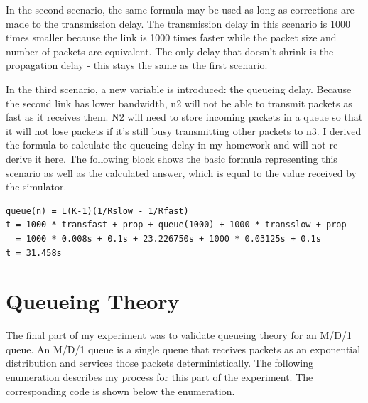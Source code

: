 \documentclass[11pt]{article}
\begin{document}
In the second scenario, the same formula may be used as long as corrections are made to the transmission delay. The transmission delay in this scenario is 1000 times smaller because the link is 1000 times faster while the packet size and number of packets are equivalent. The only delay that doesn't shrink is the propagation delay - this stays the same as the first scenario.

In the third scenario, a new variable is introduced: the queueing delay. Because the second link has lower bandwidth, n2 will not be able to transmit packets as fast as it receives them. N2 will need to store incoming packets in a queue so that it will not lose packets if it's still busy transmitting other packets to n3. I derived the formula to calculate the queueing delay in my homework and will not re-derive it here. The following block shows the basic formula representing this scenario as well as the calculated answer, which is equal to the value received by the simulator.

\vspace{5mm}
\begin{absolutelynopagebreak}
\begin{lstlisting}
queue(n) = L(K-1)(1/Rslow - 1/Rfast)
t = 1000 * transfast + prop + queue(1000) + 1000 * transslow + prop
  = 1000 * 0.008s + 0.1s + 23.226750s + 1000 * 0.03125s + 0.1s
t = 31.458s
\end{lstlisting}
\end{absolutelynopagebreak}
\vspace{5mm}

\section{Queueing Theory}

The final part of my experiment was to validate queueing theory for an M/D/1 queue. An M/D/1 queue is a single queue that receives packets as an exponential distribution and services those packets deterministically. The following enumeration describes my process for this part of the experiment. The corresponding code is shown below the enumeration. 
\end{document}
